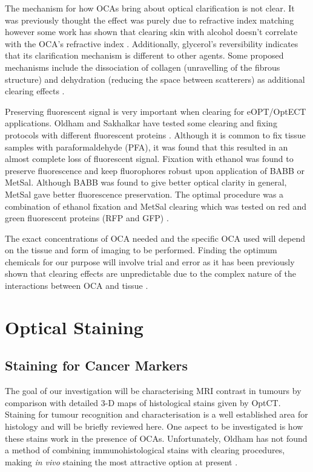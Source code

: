 The mechanism for how OCAs bring about optical clarification is not clear. It was previously thought the effect was purely due to refractive index matching however some work has shown that clearing skin with alcohol doesn't correlate with the OCA's refractive index \cite{Choi:2005, Mao:2008}. Additionally, glycerol's reversibility indicates that its clarification mechanism is different to other agents. Some  proposed mechanisms include the dissociation of collagen (unravelling of the fibrous structure) and  dehydration (reducing the space between scatterers) as additional clearing effects \cite{Yeh:2003, Wen:2009is}.




Preserving fluorescent signal is very important when clearing for eOPT/OptECT applications. Oldham and Sakhalkar have tested some clearing and fixing protocols with different fluorescent proteins \cite{Sakhalkar:2007hp, Oldham:2008dfa}. Although it is common to fix tissue samples with paraformaldehyde (PFA), it was found that this resulted in an almost complete loss of fluorescent signal. Fixation with ethanol was found to preserve fluorescence and keep fluorophores robust upon application of BABB or MetSal. Although BABB was found to give better optical clarity in general, MetSal gave better fluorescence preservation. The optimal procedure was a combination of ethanol fixation and MetSal clearing which was tested on red and green fluorescent proteins (RFP and GFP) \cite{Sakhalkar:2007hp}.


The exact concentrations of OCA needed and the specific OCA used will depend on the tissue and form of imaging to be performed. Finding the optimum chemicals for our purpose will involve trial and error as it has been previously shown that clearing effects are unpredictable due to the complex nature of the interactions between OCA and tissue \cite{Wen:2009is}.



\section{Optical Staining}
\subsection{Staining for Cancer Markers}

The goal of our investigation will be characterising MRI contrast in tumours by comparison with detailed 3-D maps of histological stains given by OptCT. Staining for tumour recognition and characterisation is a well established area for histology and will be briefly reviewed here.  One aspect to be investigated is how these stains work in the presence of OCAs. Unfortunately, Oldham has not found a method of combining immunohistological stains with clearing procedures, making \textit{in vivo} staining the most attractive option at present \cite{Oldham:2008dfa}.



